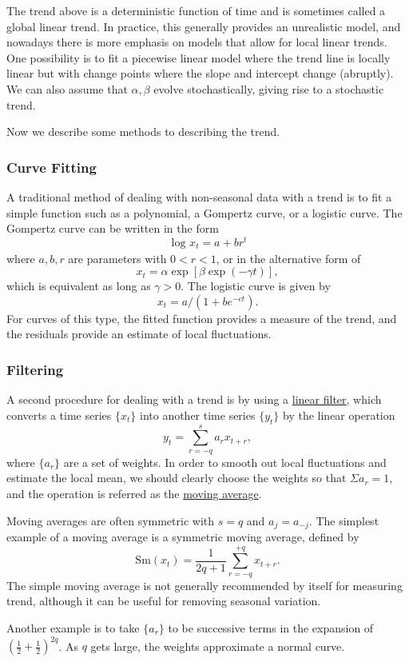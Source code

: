 The trend above is a deterministic function of time and is
sometimes called a global linear trend. In practice, this generally provides
an unrealistic model, and nowadays there is more emphasis on models that
allow for local linear trends. One possibility is to fit a piecewise linear
model where the trend line is locally linear but with change points where the
slope and intercept change (abruptly). We can also assume that $\alpha, \beta$ evolve stochastically, giving rise to a stochastic trend.

Now we describe some methods to describing the trend.


\subsubsection{Curve Fitting}
A traditional method of dealing with non-seasonal data with a trend is to fit a simple function such as a polynomial, a Gompertz curve, or a logistic curve. The Gompertz curve can be written in the form
\[ \log_{}{x_t} = a + br^t \]
where $a, b, r$ are parameters with $0 < r < 1$, or in the alternative form of 
\[ x_t = \alpha \exp{[\beta \exp{(-\gamma t)}]}, \]
which is equivalent as long as $\gamma > 0$. The logistic curve is given by 
\[ x_t = a / (1 + be^{-ct}). \]
For curves of this type, the fitted function provides a measure of the trend, and the residuals provide an estimate of local fluctuations.


\subsubsection{Filtering}
A second procedure for dealing with a trend is by using a \underline{linear filter}, which converts a time series $\{ x_t \}$ into another time series $\{ y_t \}$ by the linear operation 
\[ y_t = \sum_{r = -q}^{s} a_rx_{t+r}, \]
where $\{ a_r \}$ are a set of weights. In order to smooth out local fluctuations and estimate the local mean, we should clearly choose the weights so that $\Sigma a_r = 1$, and the operation is referred as the \underline{moving average}.

Moving averages are often symmetric with $s = q$ and $a_j = a_{-j}$. The simplest example of a moving average is a symmetric moving average, defined by 
\[ \mathrm{Sm}(x_t) = \frac{1}{2q + 1}\sum_{r = -q}^{+q} x_{t+r}. \]
The simple moving average is not generally recommended by itself for measuring trend, although it can be useful for removing seasonal variation.

Another example is to take $\{ a_r \}$ to be successive terms in the expansion of $(\frac{1}{2} + \frac{1}{2})^{2q}$. As $q$ gets large, the weights approximate a normal curve.


